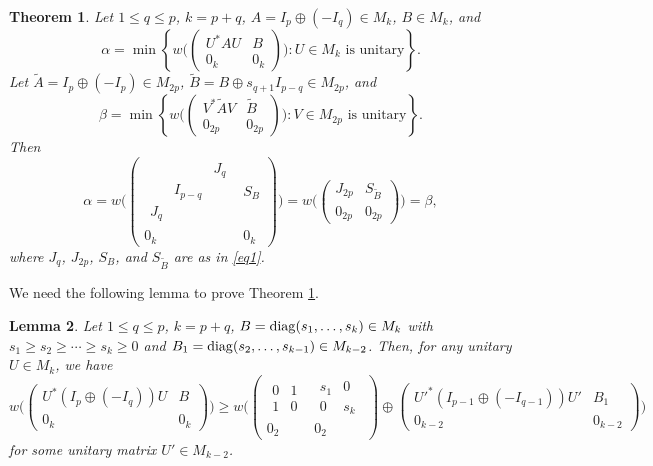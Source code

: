 \documentclass[11pt]{article}
\newtheorem{theorem}{Theorem}[section]
\newtheorem{lemma}[theorem]{Lemma}
\numberwithin{equation}{section}
\def\diag{{\rm diag}}
\begin{document}
\begin{theorem}\label{t36}
Let $1\le q\le p$, $k=p+q$, $A=I_p\oplus(-I_q)\in M_k$, $B\in M_k$, and
$$\alpha=\min\left\{w\Big(\begin{pmatrix} U^*AU & B\\ 0_k & 0_k\end{pmatrix}\Big) : U\in M_k \mbox{ is unitary}\right\}.$$
Let  $\tilde{ A} = I_p \oplus (-I_p)\in M_{2p}$, $\tilde{B} = B \oplus s_{q+1}I_{p-q}\in M_{2p}$, and
$$\beta=\min\left\{w\Big(\begin{pmatrix} V^* \tilde{A}V & \tilde{B}\\ 0_{2p} & 0_{2p}\end{pmatrix}\Big) : V\in M_{2p} \mbox{ is unitary}\right\}.$$
Then
$$
\alpha=w\Big(\left(\begin{array}{c|c}\begin{array}{ccc}  & & J_q\\ & I_{p-q} & \\ J_q & & \end{array} & S_B
\\ \hline 0_k & 0_k\end{array}\right)\Big)
= w\Big(\begin{pmatrix}
J_{2p} & S_{\tilde{B}} \\ 0_{2p} & 0_{2p}
\end{pmatrix}\Big)=\beta,
$$
where $J_q$, $J_{2p}$, $S_B$, and $S_{\tilde{B}}$ are as in \eqref{eq1}.
\end{theorem}

We need the following lemma to prove Theorem \ref{t36}.

\begin{lemma}\label{l35}
Let $1\le q\le p$, $k=p+q$, $B=\diag(s_1, \dots, s_k)\in M_k$ with $s_1\ge s_2\ge \cdots\ge s_k\ge 0$ and $B_1=\diag(s_{2}, \dots, s_{k-1})\in M_{k-2}$. Then, for any unitary $U\in M_k$, we have
$$
 w\Big(\begin{pmatrix} U^*(I_p\oplus (-I_q))U & B\\ 0_k & 0_k\end{pmatrix}\Big)
\ge   w\Big(\left(\begin{array}{c|c}\begin{array}{cc} 0 & 1\\ 1 & 0\end{array} & \begin{array}{cc} s_1 & 0\\ 0 & s_k\end{array}
\\ \hline 0_2 & 0_2\end{array}\right)\oplus
\begin{pmatrix} {U'}^*(I_{p-1}\oplus (-I_{q-1}))U' & B_1\\ 0_{k-2} & 0_{k-2}\end{pmatrix}\Big) $$
for some unitary matrix $U'\in M_{k-2}$.
\end{lemma}
\end{document}
